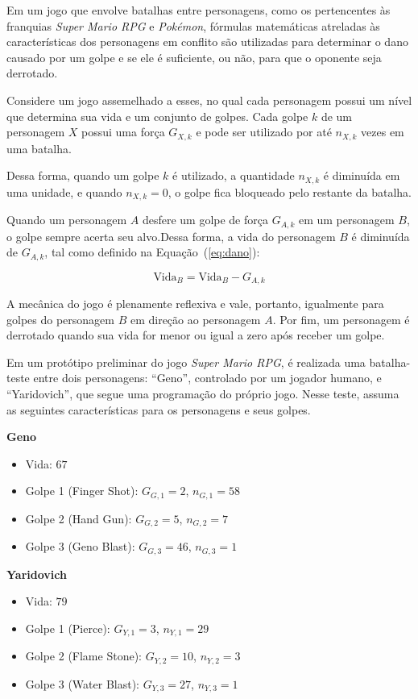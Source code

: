 \documentclass[12pt]{article}
\begin{document}
\begin{tcolorbox}[title=Enunciado da Questão,colback=gray!5,colframe=black]

Em um jogo que envolve batalhas entre personagens, como os pertencentes às
franquias \textit{Super Mario RPG} e \textit{Pokémon}, fórmulas matemáticas
atreladas às características dos personagens em conflito são utilizadas para
determinar o dano causado por um golpe e se ele é suficiente, ou não, para que
o oponente seja derrotado.

Considere um jogo assemelhado a esses, no qual cada personagem possui um
nível que determina sua vida e um conjunto de golpes. Cada golpe $k$ de um
personagem $X$ possui uma força $G_{X,k}$ e pode ser utilizado por até
$n_{X,k}$ vezes em uma batalha.

Dessa forma, quando um golpe $k$ é utilizado, a quantidade $n_{X,k}$ é
diminuída em uma unidade, e quando $n_{X,k} = 0$, o golpe fica bloqueado
pelo restante da batalha.

Quando um personagem $A$ desfere um golpe de força $G_{A,k}$ em um
personagem $B$, o golpe sempre acerta seu alvo.Dessa forma, a vida do personagem $B$ é diminuída de $G_{A,k}$, tal como
definido na Equação~(\ref{eq:dano}):

\begin{equation}
\text{Vida}_B = \text{Vida}_B - G_{A,k}
\label{eq:dano}
\end{equation}

A mecânica do jogo é plenamente reflexiva e vale, portanto, igualmente
para golpes do personagem $B$ em direção ao personagem $A$.
Por fim, um personagem é derrotado quando sua vida for menor ou igual
a zero após receber um golpe.

Em um protótipo preliminar do jogo \textit{Super Mario RPG}, é realizada
uma batalha-teste entre dois personagens: ``Geno'', controlado por um
jogador humano, e ``Yaridovich'', que segue uma programação do próprio jogo.
Nesse teste, assuma as seguintes características para os personagens
e seus golpes.

\textbf{Geno}
\begin{itemize}
\item Vida: $67$
\item Golpe 1 (Finger Shot): $G_{G,1}=2$, $n_{G,1}=58$
\item Golpe 2 (Hand Gun): $G_{G,2}=5$, $n_{G,2}=7$
\item Golpe 3 (Geno Blast): $G_{G,3}=46$, $n_{G,3}=1$
\end{itemize}

\textbf{Yaridovich}
\begin{itemize}
\item Vida: $79$
\item Golpe 1 (Pierce): $G_{Y,1}=3$, $n_{Y,1}=29$
\item Golpe 2 (Flame Stone): $G_{Y,2}=10$, $n_{Y,2}=3$
\item Golpe 3 (Water Blast): $G_{Y,3}=27$, $n_{Y,3}=1$
\end{itemize}

\end{tcolorbox}
\end{document}
